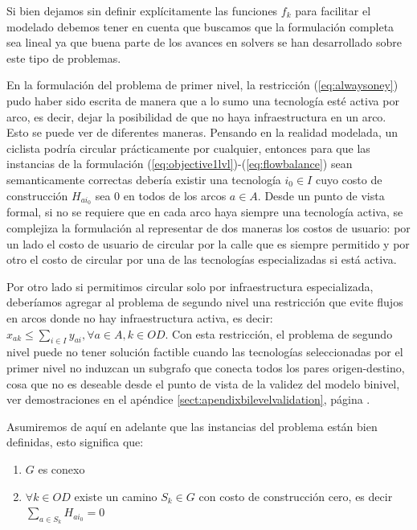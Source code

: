\documentclass{article}
\begin{document}

  Si bien dejamos sin definir explícitamente las funciones $f_k$ para facilitar el modelado debemos tener en cuenta que buscamos que la formulación completa sea lineal ya que buena parte de los avances en solvers se han desarrollado sobre este tipo de problemas.

  En la formulación del problema de primer nivel, la restricción (\ref{eq:alwaysoney}) pudo haber sido escrita de manera que a lo sumo una tecnología esté activa por arco, es decir, dejar la posibilidad de que no haya infraestructura en un arco. Esto se puede ver de diferentes maneras. Pensando en la realidad modelada, un ciclista podría circular prácticamente por cualquier, entonces para que las instancias de la formulación (\ref{eq:objective1lvl})-(\ref{eq:flowbalance}) sean semanticamente correctas debería existir una tecnología $i_0 \in I$ cuyo costo de construcción $H_{ai_0}$ sea 0 en todos de los arcos $a \in A$. Desde un punto de vista formal, si no se requiere que en cada arco haya siempre una tecnología activa, se complejiza la formulación al representar de dos maneras los costos de usuario: por un lado el costo de usuario de circular por la calle que es siempre permitido y por otro el costo de circular por una de las tecnologías especializadas si está activa.

  Por otro lado si permitimos circular solo por infraestructura especializada, deberíamos agregar al problema de segundo nivel una restricción que evite flujos en arcos donde no hay infraestructura activa, es decir: $x_{ak} \leq \sum_{i \in I} y_{ai}, \forall a \in A, k \in OD$. Con esta restricción, el problema de segundo nivel puede no tener solución factible cuando las tecnologías seleccionadas por el primer nivel no induzcan un subgrafo que conecta todos los pares origen-destino, cosa que no es deseable desde el punto de vista de la validez del modelo binivel, ver demostraciones en el apéndice \ref{sect:apendixbilevelvalidation}, página \pageref{sect:apendixbilevelvalidation}.

  Asumiremos de aquí en adelante que las instancias del problema están bien definidas, esto significa que:

  \begin{enumerate}
    \item {$G$ es conexo}
    \item {$\forall k \in OD$ existe un camino $S_k \in G$ con costo de construcción cero, es decir $\sum_{a \in S_k} H_{ai_0} = 0$}
  \end{enumerate}
\end{document}

